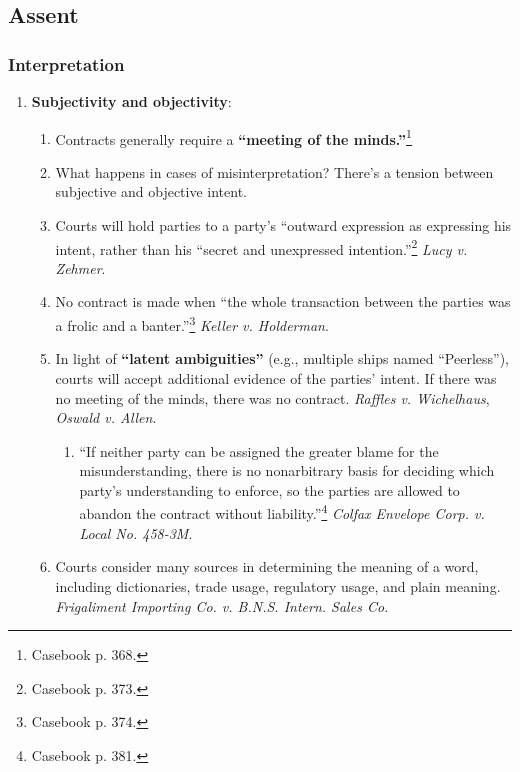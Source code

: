 \subsection{Assent}

\subsubsection{Interpretation}

\begin{enumerate}
    \item \textbf{Subjectivity and objectivity}:
    \begin{enumerate}
        \item Contracts generally require a \textbf{``meeting of the 
        minds.''}\footnote{Casebook p. 368.}
        \item What happens in cases of misinterpretation? There's a tension 
        between subjective and objective intent.
        \item Courts will hold parties to a party's ``outward expression as 
        expressing his intent, rather than his ``secret and unexpressed 
        intention.''\footnote{Casebook p. 373.} \emph{Lucy v. Zehmer}.
        \item No contract is made when ``the whole transaction between the 
        parties was a frolic and a banter.''\footnote{Casebook p. 374.} 
        \emph{Keller v.  Holderman}.
        \item In light of \textbf{``latent ambiguities''} (e.g., multiple 
        ships named ``Peerless''), courts will accept additional evidence of 
        the parties' intent. If there was no meeting of the minds, there was 
        no contract. \emph{Raffles v. Wichelhaus}, \emph{Oswald v. Allen}.
        \begin{enumerate}
            \item ``If neither party can be assigned the greater blame for the 
            misunderstanding, there is no nonarbitrary basis for deciding 
            which party's understanding to enforce, so the parties are allowed 
            to abandon the contract without liability.''\footnote{Casebook p. 
            381.} \emph{Colfax Envelope Corp. v. Local No. 458-3M}.
        \end{enumerate}
        \item Courts consider many sources in determining the meaning of a 
        word, including dictionaries, trade usage, regulatory usage, and plain 
        meaning.  \emph{Frigaliment Importing Co. v. B.N.S. Intern. Sales Co.}

\end{enumerate}
\end{enumerate}
